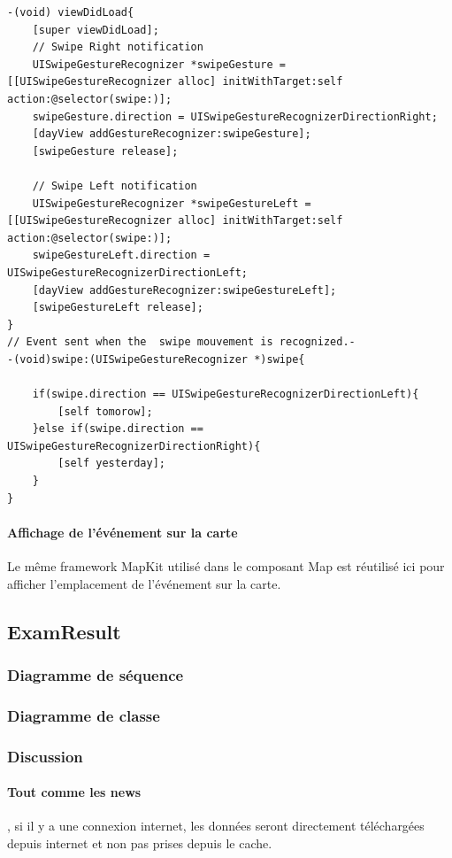 \begin{lstlisting}[name=Recherche dans UITableView  , label=searchTBV]
-(void) viewDidLoad{
    [super viewDidLoad];
    // Swipe Right notification
    UISwipeGestureRecognizer *swipeGesture = [[UISwipeGestureRecognizer alloc] initWithTarget:self action:@selector(swipe:)];
    swipeGesture.direction = UISwipeGestureRecognizerDirectionRight;
    [dayView addGestureRecognizer:swipeGesture];
    [swipeGesture release];
    
    // Swipe Left notification
    UISwipeGestureRecognizer *swipeGestureLeft = [[UISwipeGestureRecognizer alloc] initWithTarget:self action:@selector(swipe:)];
    swipeGestureLeft.direction = UISwipeGestureRecognizerDirectionLeft;
    [dayView addGestureRecognizer:swipeGestureLeft];
    [swipeGestureLeft release];
}
// Event sent when the  swipe mouvement is recognized.-
-(void)swipe:(UISwipeGestureRecognizer *)swipe{
    
    if(swipe.direction == UISwipeGestureRecognizerDirectionLeft){
        [self tomorow];
    }else if(swipe.direction == UISwipeGestureRecognizerDirectionRight){
        [self yesterday];   
    }
}
\end{lstlisting}
				\paragraph{Affichage de l'événement sur la carte}  Le même framework MapKit utilisé dans le composant Map est réutilisé ici pour afficher l'emplacement de l'événement sur la carte.

	\subsection{ExamResult}
					\subsubsection*{Diagramme de séquence}

					\subsubsection*{Diagramme de classe}
						 	
					\subsubsection*{Discussion}
					\paragraph{Tout comme les news}, si il y a une connexion internet, les données seront directement téléchargées depuis internet et non pas prises depuis le cache.
